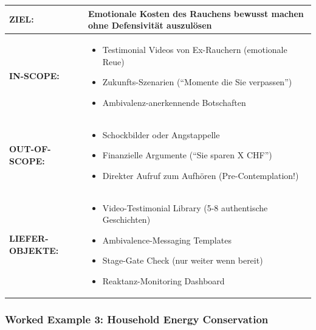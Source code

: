 \begin{tcolorbox}[colback=blue!5!white, colframe=blue!75!black,
    title=\textbf{Anticipated Regret --- Full Specification}]

\begin{tabular}{@{}p{2.5cm}p{10cm}@{}}
\textbf{ZIEL:} & Emotionale Kosten des Rauchens bewusst machen ohne Defensivität auszulösen \\
\midrule
\textbf{IN-SCOPE:} &
\begin{itemize}[nosep,leftmargin=*]
    \item[\checkmark] Testimonial Videos von Ex-Rauchern (emotionale Reue)
    \item[\checkmark] Zukunfts-Szenarien (``Momente die Sie verpassen'')
    \item[\checkmark] Ambivalenz-anerkennende Botschaften
\end{itemize} \\
\midrule
\textbf{OUT-OF-SCOPE:} &
\begin{itemize}[nosep,leftmargin=*]
    \item[$\times$] Schockbilder oder Angstappelle
    \item[$\times$] Finanzielle Argumente (``Sie sparen X CHF'')
    \item[$\times$] Direkter Aufruf zum Aufhören (Pre-Contemplation!)
\end{itemize} \\
\midrule
\textbf{LIEFER-OBJEKTE:} &
\begin{itemize}[nosep,leftmargin=*]
    \item[$\square$] Video-Testimonial Library (5-8 authentische Geschichten)
    \item[$\square$] Ambivalence-Messaging Templates
    \item[$\square$] Stage-Gate Check (nur weiter wenn bereit)
    \item[$\square$] Reaktanz-Monitoring Dashboard
\end{itemize} \\
\end{tabular}

\end{tcolorbox}


\subsubsection{Worked Example 3: Household Energy Conservation}
\label{subsubsec:example-climate}

